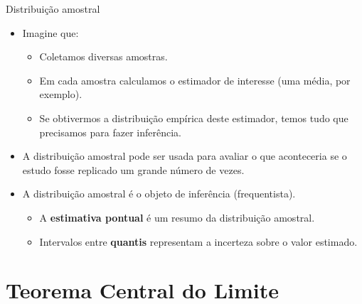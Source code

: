 \documentclass[
  ignorenonframetext,
  serif,
  professionalfont,
  usenames,
  dvipsnames,
  aspectratio = 169]{beamer}
\providecommand{\tightlist}{%
  \setlength{\itemsep}{0pt}\setlength{\parskip}{0pt}}
\renewcommand{\tightlist}{%
  \setlength{\itemsep}{0\baselineskip}
  \setlength{\parskip}{0.25\baselineskip}
}
\begin{document}
\begin{frame}{Distribuição amostral}
\protect\hypertarget{distribuiuxe7uxe3o-amostral-2}{}
\begin{itemize}
\tightlist
\item
  Imagine que:

  \begin{itemize}
  \tightlist
  \item
    Coletamos diversas amostras.
  \item
    Em cada amostra calculamos o estimador de interesse (uma média, por
    exemplo).
  \item
    Se obtivermos a distribuição empírica deste estimador, temos tudo
    que precisamos para fazer inferência.
  \end{itemize}
\end{itemize}

\vspace{0.3cm}

\begin{itemize}
\tightlist
\item
  A distribuição amostral pode ser usada para avaliar o que aconteceria
  se o estudo fosse replicado um grande número de vezes.
\end{itemize}

\vspace{0.3cm}

\begin{itemize}
\item
  A distribuição amostral é o objeto de inferência (frequentista).

  \begin{itemize}
  \item
    A \textbf{estimativa pontual} é um resumo da distribuição amostral.
  \item
    Intervalos entre \textbf{quantis} representam a incerteza sobre o
    valor estimado.
  \end{itemize}
\end{itemize}
\end{frame}

\hypertarget{teorema-central-do-limite}{%
\section{Teorema Central do Limite}\label{teorema-central-do-limite}}
\end{document}
